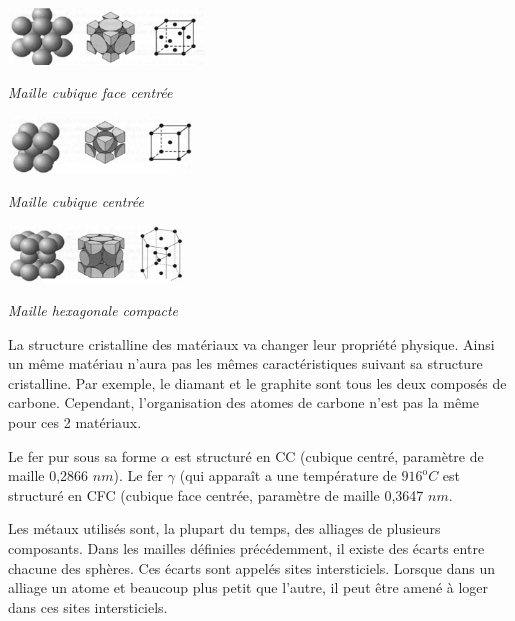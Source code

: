 \documentclass[11pt,oneside]{article}
\begin{document}
\noindent
\begin{minipage}[c]{.3\linewidth}
\begin{center}
\includegraphics[height=1.5cm]{png/cfc}

\textit{Maille cubique face centrée}
\end{center}
\end{minipage}
\hfill
\begin{minipage}[c]{.3\linewidth}
\begin{center}
\includegraphics[height=1.5cm]{png/cc}

\textit{Maille cubique centrée}
\end{center}
\end{minipage}
\hfill
\begin{minipage}[c]{.3\linewidth}
\begin{center}
\includegraphics[height=1.5cm]{png/hc}

\textit{Maille hexagonale compacte}
\end{center}
\end{minipage}

La structure cristalline des matériaux va changer leur propriété physique. Ainsi un même matériau n'aura pas les mêmes caractéristiques suivant sa structure cristalline. Par exemple, le diamant et le graphite sont tous les deux composés de carbone. Cependant, l'organisation des atomes de carbone n'est pas la même pour ces 2 matériaux. 

\begin{exemple}
Le fer pur sous sa forme $\alpha$ est structuré en CC (cubique centré, paramètre de maille 0,2866 $nm$). Le fer $\gamma$ (qui apparaît a une température de $916^\text{o}C$ est structuré en CFC (cubique face centrée, paramètre de maille 0,3647 $nm$.
\end{exemple}


Les métaux utilisés sont, la plupart du temps, des alliages de plusieurs composants. Dans les mailles définies précédemment, il existe des écarts entre chacune des sphères. Ces écarts sont appelés sites intersticiels. Lorsque dans un alliage un atome et beaucoup plus petit que l'autre, il peut être amené à loger dans ces sites intersticiels.
\end{document}
